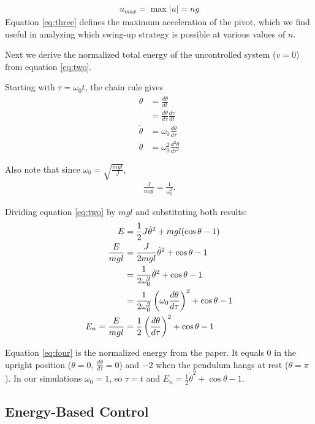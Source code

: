 \documentclass{article}
\begin{document}
\begin{align}
    u_{max}= \max{|u|} = ng \label{eq:three}
\end{align}
Equation \eqref{eq:three} defines the maximum acceleration of the pivot, which we find useful in analyzing which swing-up strategy is possible at various values of $n$.

Next we derive the normalized total energy of the uncontrolled system ($v=0$) from equation \eqref{eq:two}.

Starting with $\tau = \omega_0 t$, the chain rule gives
\begin{align*}
    \dot{\theta} &= \frac{d \theta}{dt} \\
    &= \frac{d \theta}{d\tau} \frac{d\tau}{dt} \\
    \dot{\theta} &= \omega_0\frac{d \theta}{d\tau} \\
    \ddot{\theta} &= \omega_0^2\frac{d^2 \theta}{d\tau^2}
\end{align*}

Also note that since $\omega_0 = \sqrt{\frac{mgl}{J}}$,
\begin{align*}
    \frac{J}{mgl} = \frac{1}{\omega_0^2}.
\end{align*}

Dividing equation \eqref{eq:two} by $mgl$ and substituting both results:
\begin{align}
    E &= \frac{1}{2}J\dot{\theta}^2 + mgl(\cos{\theta} - 1) \notag \\
    \frac{E}{mgl} &= \frac{J}{2mgl}\dot{\theta}^2 + \cos{\theta} - 1 \notag \\
    &= \frac{1}{2\omega_0^2}\dot{\theta}^2 + \cos{\theta} - 1 \notag \\
    &= \frac{1}{2\omega_0^2}\left(\omega_0\frac{d\theta}{d\tau}\right)^2 + \cos{\theta} - 1 \notag \\
    E_n = \frac{E}{mgl} &= \frac{1}{2}\left(\frac{d\theta}{d\tau}\right)^2 + \cos{\theta} - 1 \label{eq:four}
\end{align}

Equation \eqref{eq:four} is the normalized energy from the paper. It equals $0$ in the upright position ($\theta = 0$, $\frac{d\theta}{d\tau} = 0$) and $-2$ when the pendulum hangs at rest ($\theta = \pi$). In our simulations $\omega_0 = 1$, so $\tau = t$ and $E_n = \frac{1}{2}\dot{\theta}^2 + \cos{\theta} - 1$.

\subsection{Energy-Based Control}
\end{document}
